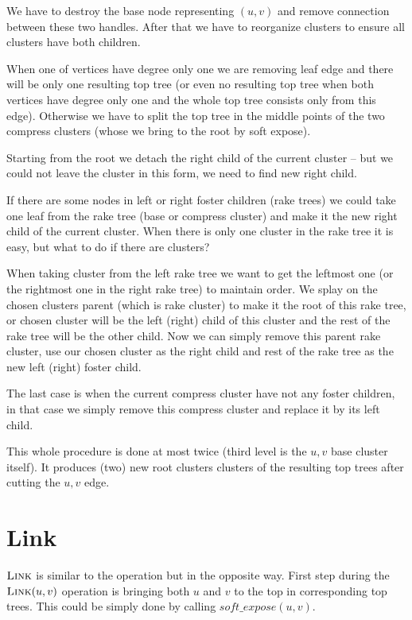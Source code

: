 
We have to destroy the base node representing $(u,v)$ and remove connection
between these two handles. After that we have to reorganize clusters to ensure
all clusters have both children.

When one of vertices have degree only one we are removing leaf edge and there
will be only one resulting top tree (or even no resulting top tree when both
vertices have degree only one and the whole top tree consists only from this
edge). Otherwise we have to split the top tree in the middle points of the two
compress clusters (whose we bring to the root by soft expose).

Starting from the root we detach the right child of the current cluster -- but
we could not leave the cluster in this form, we need to find new right child.

If there are some nodes in left or right foster children (rake trees) we could
take one leaf from the rake tree (base or compress cluster) and make it the new
right child of the current cluster. When there is only one cluster in the rake
tree it is easy, but what to do if there are clusters?

When taking cluster from the left rake tree we want to get the leftmost one
(or the rightmost one in the right rake tree) to maintain order. We splay on
the chosen clusters parent (which is rake cluster) to make it the root of this
rake tree, or chosen cluster will be the left (right) child of this cluster and
the rest of the rake tree will be the other child. Now we can simply remove this
parent rake cluster, use our chosen cluster as the right child and rest of the
rake tree as the new left (right) foster child.

The last case is when the current compress cluster have not any foster children,
in that case we simply remove this compress cluster and replace it by its left
child.

This whole procedure is done at most twice (third level is the $u,v$ base
cluster itself). It produces (two) new root clusters clusters of the resulting
top trees after cutting the $u,v$ edge.

\section{Link}

$\hbox{\sc Link}$ is similar to the \Cut{} operation but in the opposite way. First step
during the $\hbox{\sc Link}(u,v)$ operation is bringing both $u$ and $v$ to the top in
corresponding top trees. This could be simply done by calling
$soft\_expose(u,v)$.

